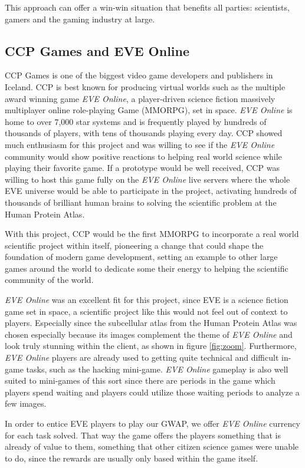 This approach can offer a win-win situation that benefits all parties: scientists, gamers and the gaming industry at large.

\subsection{CCP Games and EVE Online}

CCP Games \cite{CCP} is one of the biggest video game developers and publishers in Iceland. CCP is best known for producing virtual worlds such as the multiple award winning game \emph{EVE Online}, a player-driven science fiction massively multiplayer online role-playing Game (MMORPG), set in space. \emph{EVE Online} is home to over 7,000 star systems and is frequently played by hundreds of thousands of players, with tens of thousands playing every day. CCP showed much enthusiasm for this project and was willing to see if the \emph{EVE Online} community would show positive reactions to helping real world science while playing their favorite game. If a prototype would be well received, CCP was willing to host this game fully on the \emph{EVE Online} live servers where the whole EVE universe would be able to participate in the project, activating hundreds of thousands of brilliant human brains to solving the scientific problem at the Human Protein Atlas.

With this project, CCP would be the first MMORPG to incorporate a real world scientific project within itself, pioneering a change that could shape the foundation of modern game development, setting an example to other large games around the world to dedicate some their energy to helping the scientific community of the world.

\emph{EVE Online} was an excellent fit for this project, since EVE is a science fiction game set in space, a scientific project like this would not feel out of context to players. Especially since the subcellular atlas from the Human Protein Atlas was chosen especially because its images complement the theme of \emph{EVE Online} and look truly stunning within the client, as shown in figure \ref{fig:zoom}. Furthermore, \emph{EVE Online} players are already used to getting quite technical and difficult in-game tasks, such as the hacking mini-game. \emph{EVE Online} gameplay is also well suited to mini-games of this sort since there are periods in the game which players spend waiting and players could utilize those waiting periods to analyze a few images.

In order to entice EVE players to play our GWAP, we offer \emph{EVE Online} currency for each task solved. That way the game offers the players something that is already of value to them, something that other citizen science games were unable to do, since the rewards are usually only based within the game itself.

